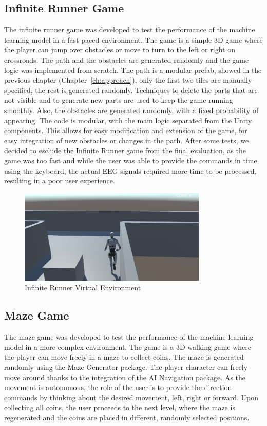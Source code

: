 \subsection*{Infinite Runner Game}
The infinite runner game was developed to test the performance of the machine learning model in a fast-paced environment.
The game is a simple 3D game where the player can jump over obstacles or move to turn to the left or right on crossroads.
The path and the obstacles are generated randomly and the game logic was implemented from scratch.
The path is a modular prefab, showed in the previous chapter (Chapter~\ref{ch:approach}), only the first two tiles are manually specified, the rest is generated randomly.
Techniques to delete the parts that are not visible and to generate new parts are used to keep the game running smoothly.
Also, the obstacles are generated randomly, with a fixed probability of appearing.
The code is modular, with the main logic separated from the Unity components.
This allows for easy modification and extension of the game, for easy integration of new obstacles or changes in the path.
After some tests, we decided to esclude the Infinite Runner game from the final evaluation, as the game was too fast and while the user was able to provide the commands in time using the keyboard, the actual EEG signals required more time to be processed, resulting in a poor user experience. 
\begin{figure}[!htbp]
    \centering
    \includegraphics[width=0.8\textwidth]{Figures/Methodology/infinite_runner}
    \caption{Infinite Runner Virtual Environment}\label{fig:infinite_runner}
\end{figure}

\subsection*{Maze Game}
The maze game was developed to test the performance of the machine learning model in a more complex environment.
The game is a 3D walking game where the player can move freely in a maze to collect coins.
The maze is generated randomly using the Maze Generator package.
The player character can freely move around thanks to the integration of the AI Navigation package.
As the movement is autonomous, the role of the user is to provide the direction commands by thinking about the desired movement, left, right or forward.
Upon collecting all coins, the user proceeds to the next level, where the maze is regenerated and the coins are placed in different, randomly selected positions.

